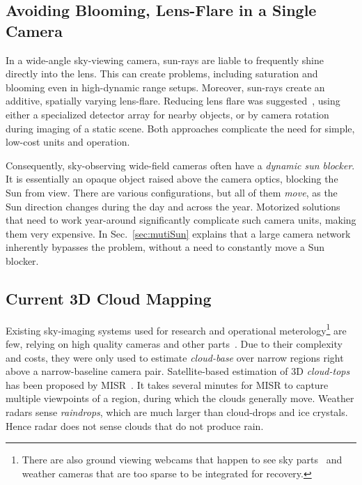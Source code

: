 \documentclass[runningheads]{llncs}
\begin{document}
\subsection{Avoiding Blooming, Lens-Flare in a Single Camera}
\label{sec:Signelflare}

In a wide-angle sky-viewing camera, sun-rays are liable to frequently shine directly into the lens. This can create problems, including saturation and blooming even in high-dynamic range setups. Moreover, sun-rays create an additive, spatially varying lens-flare. Reducing lens flare was suggested~\cite{Koreban2009,Raskar2008,Talvala2007,Rouf2011}, using either a specialized detector array for nearby objects, or by camera rotation during imaging of a static scene. Both approaches complicate the need for simple, low-cost units and operation.

Consequently, sky-observing wide-field cameras often have a {\em dynamic sun blocker}. It is essentially an opaque object raised above the camera optics, blocking the Sun from view. There are various configurations, but all of them {\em move}, as the Sun direction changes during the day and across the year. Motorized solutions~\cite{Pust2008} that need to work year-around significantly complicate such camera units, making them very expensive. In Sec.~\ref{sec:mutiSun} explains that a large camera network inherently bypasses the problem, without a need to constantly move a Sun blocker.




\subsection{Current 3D Cloud Mapping}
\label{sec:current3D}

Existing sky-imaging systems used for research and operational meterology\footnote{There are also ground viewing webcams that happen to see sky parts~\cite{bradley,jacobs14cloudmap} and weather cameras
that are too sparse to be integrated for recovery.} are few, relying on high quality cameras and other parts~\cite{allmen,angeo-27-953-2009,cazorla,long,Seiz,kassianov}. Due to their complexity and costs, they were only used to estimate {\em cloud-base} over narrow regions right above a narrow-baseline camera pair. Satellite-based estimation of 3D {\em cloud-tops} has been proposed by MISR~\cite{Seiz2006}. It takes several minutes for MISR to capture multiple viewpoints of a region, during which the clouds generally move. Weather radars sense {\em raindrops}, which are much larger than cloud-drops and ice crystals. Hence radar does not sense clouds that do not produce rain.
\end{document}
